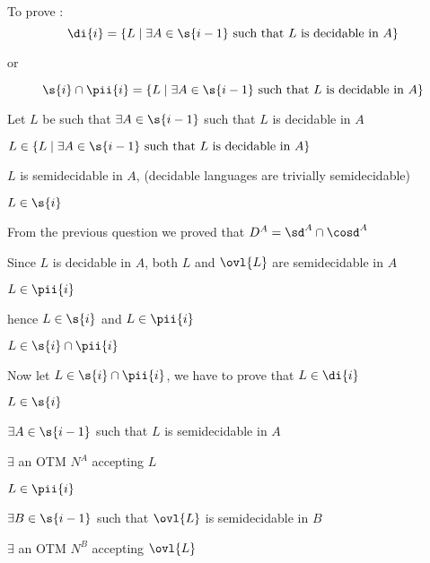 
To prove :
\[
    \di{i} = \{
        L \mid \exists A \in \s{i - 1} \text{ such that $L$ is decidable in $A$}
    \}
\]

or

\[
    \s{i} \cap \pii{i} = \{
        L \mid \exists A \in \s{i - 1} \text{ such that $L$ is decidable in $A$}
    \}
\]

Let $L$ be such that $\exists A \in \s{i - 1}$ such that $L$ is decidable in $A$

\imp
$
L \in \{
    L \mid \exists A \in \s{i - 1} \text{ such that $L$ is decidable in $A$}
\}
$

\imp
$L$ is semidecidable in $A$, (decidable languages are trivially semidecidable)

\imp
$L \in \s{i}$

From the previous question we proved that $D^A = \sd^A \cap \cosd^A$

\imp
Since $L$ is decidable in $A$, both $L$ and $\ovl{L}$ are semidecidable in $A$

\imp
$L \in \pii{i}$

hence $L \in \s{i}$ and $L \in \pii{i}$

\imp
$L \in \s{i} \cap \pii{i}$


Now let $L \in \s{i} \cap \pii{i}$, we have to prove that $L \in \di{i}$


$L \in \s{i}$

\imp
$\exists A \in \s{i - 1}$ such that $L$ is semidecidable in $A$

\imp
$\exists$ an OTM $N^A$ accepting $L$

$L \in \pii{i}$

\imp
$\exists B \in \s{i - 1}$ such that $\ovl{L}$ is semidecidable in $B$

\imp
$\exists$ an OTM $N^B$ accepting $\ovl{L}$









